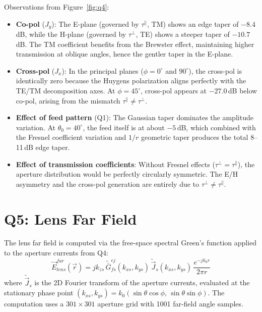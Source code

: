 \documentclass{article}
\begin{document}
Observations from Figure~\ref{fig:q4}:
\begin{itemize}
\item \textbf{Co-pol} ($J_y$): The E-plane (governed by $\tau^\parallel$, TM) shows an edge taper of $-8.4$\,dB, while the H-plane (governed by $\tau^\perp$, TE) shows a steeper taper of $-10.7$\,dB. The TM coefficient benefits from the Brewster effect, maintaining higher transmission at oblique angles, hence the gentler taper in the E-plane.

\item \textbf{Cross-pol} ($J_x$): In the principal planes ($\phi = 0^\circ$ and $90^\circ$), the cross-pol is identically zero because the Huygens polarization aligns perfectly with the TE/TM decomposition axes. At $\phi = 45^\circ$, cross-pol appears at $-27.0$\,dB below co-pol, arising from the mismatch $\tau^\parallel \neq \tau^\perp$.

\item \textbf{Effect of feed pattern} (Q1): The Gaussian taper dominates the amplitude variation. At $\theta_0 = 40^\circ$, the feed itself is at about $-5$\,dB, which combined with the Fresnel coefficient variation and $1/r$ geometric taper produces the total 8--11\,dB edge taper.

\item \textbf{Effect of transmission coefficients}: Without Fresnel effects ($\tau^\perp = \tau^\parallel$), the aperture distribution would be perfectly circularly symmetric. The E/H asymmetry and the cross-pol generation are entirely due to $\tau^\perp \neq \tau^\parallel$.
\end{itemize}

\section{Q5: Lens Far Field}

The lens far field is computed via the free-space spectral Green's function applied to the aperture currents from Q4:
\begin{equation}\label{eq:lens_farfield}
\vec{E}^{far}_{lens}(\vec{r}) = jk_{zs}\,\tilde{\bar{G}}^{ej}_{fs}(k_{xs},k_{ys})\,\tilde{\vec{J}}_s(k_{xs},k_{ys})\,\frac{e^{-jk_0 r}}{2\pi r}
\end{equation}
where $\tilde{\vec{J}}_s$ is the 2D Fourier transform of the aperture currents, evaluated at the stationary phase point $(k_{xs},k_{ys}) = k_0(\sin\theta\cos\phi,\,\sin\theta\sin\phi)$. The computation uses a $301\times301$ aperture grid with 1001 far-field angle samples.
\end{document}

